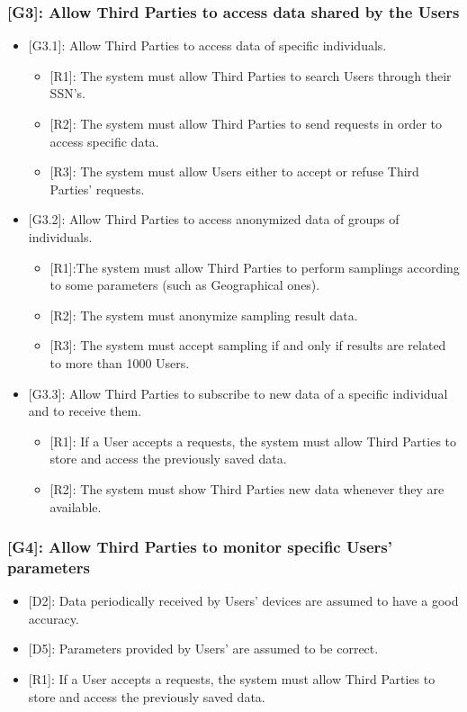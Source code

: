 \documentclass[12pt,a4paper]{article}
\begin{document}
	\subsubsection*{{[}{G3}{]}: Allow Third Parties to access data shared by the Users}
	\begin{itemize}
		\item {[G3.1]}: Allow Third Parties to access data of specific individuals.
		\begin{itemize}
			\item {[R1]}: The system must allow Third Parties to search Users through their SSN's.
			\item {[R2]}: The system must allow Third Parties to send requests in order to access specific data.
			\item {[R3]}: The system must allow Users either to accept or refuse Third Parties' requests.
		\end{itemize} 
		
		\item {[G3.2]}: Allow Third Parties to access anonymized data of groups of individuals.
		\begin{itemize}
			\item {[R1]}:The system must allow Third Parties to perform samplings according to some parameters (such as Geographical ones).
			\item {[R2]}: The system must anonymize sampling result data.
			\item {[R3]}: The system must accept sampling if and only if results are related to more than 1000 Users.
		\end{itemize} 
	
		\item {[G3.3]}: Allow Third Parties to subscribe to new data of a specific individual and to receive them.
		\begin{itemize}
			\item {[R1]}: If a User accepts a requests, the system must allow Third Parties to store and access the previously saved data.
			\item {[R2]}: The system must show Third Parties new data whenever they are available.
		\end{itemize}
	\end{itemize}
	\subsubsection*{{[}{G4}{]}: Allow Third Parties to monitor specific Users' parameters}
		\begin{itemize}
			\item {[D2]}: Data periodically received by Users' devices are assumed to have a good accuracy. 
			\item {[D5]}: Parameters provided by Users' are assumed to be correct. 
			
			\item {[R1]}: If a User accepts a requests, the system must allow Third Parties to store and access the previously saved data.
		\end{itemize}
	
\end{document}

